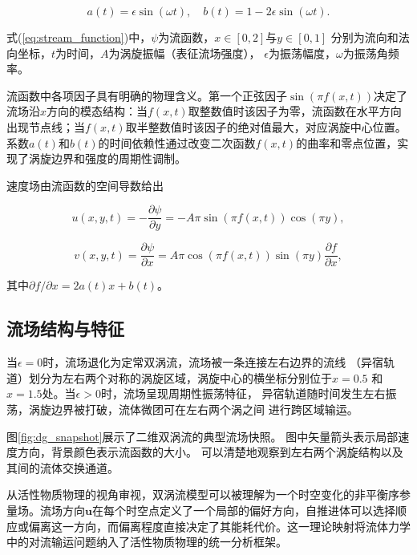 \begin{equation}
    a(t) = \epsilon \sin(\omega t), \quad b(t) = 1 - 2\epsilon \sin(\omega t).
    \label{eq:ab_functions}
\end{equation}

式(\ref{eq:stream_function})中，$\psi$为流函数，$x \in [0, 2]$与$y \in [0, 1]$
分别为流向和法向坐标，$t$为时间，$A$为涡旋振幅（表征流场强度），
$\epsilon$为振荡幅度，$\omega$为振荡角频率。

流函数中各项因子具有明确的物理含义。第一个正弦因子$\sin(\pi f(x, t))$决定了流场沿$x$方向的模态结构：当$f(x,t)$取整数值时该因子为零，流函数在水平方向出现节点线；当$f(x,t)$取半整数值时该因子的绝对值最大，对应涡旋中心位置。系数$a(t)$和$b(t)$的时间依赖性通过改变二次函数$f(x,t)$的曲率和零点位置，实现了涡旋边界和强度的周期性调制。

速度场由流函数的空间导数给出

\begin{equation}
    u(x, y, t) = -\frac{\partial \psi}{\partial y} = -A\pi \sin(\pi f(x, t)) \cos(\pi y),
    \label{eq:u_velocity}
\end{equation}

\begin{equation}
    v(x, y, t) = \frac{\partial \psi}{\partial x}
                = A\pi \cos(\pi f(x, t)) \sin(\pi y) \frac{\partial f}{\partial x},
    \label{eq:v_velocity}
\end{equation}

其中$\partial f / \partial x = 2a(t)x + b(t)$。

\subsection{流场结构与特征}

当$\epsilon = 0$时，流场退化为定常双涡流，流场被一条连接左右边界的流线
（异宿轨道）划分为左右两个对称的涡旋区域，涡旋中心的横坐标分别位于$x=0.5$
和$x=1.5$处。当$\epsilon > 0$时，流场呈现周期性振荡特征，
异宿轨道随时间发生左右振荡，涡旋边界被打破，流体微团可在左右两个涡之间
进行跨区域输运。

图\ref{fig:dg_snapshot}展示了二维双涡流的典型流场快照。
图中矢量箭头表示局部速度方向，背景颜色表示流函数的大小。
可以清楚地观察到左右两个涡旋结构以及其间的流体交换通道。

从活性物质物理的视角审视，双涡流模型可以被理解为一个时空变化的非平衡序参量场。流场方向$\mathbf{u}$在每个时空点定义了一个局部的偏好方向，自推进体可以选择顺应或偏离这一方向，而偏离程度直接决定了其能耗代价。这一理论映射将流体力学中的对流输运问题纳入了活性物质物理的统一分析框架。

